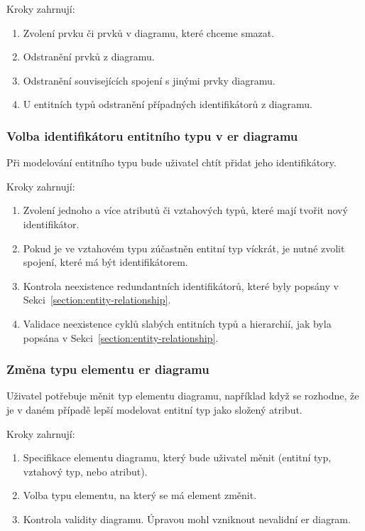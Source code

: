 Kroky zahrnují:
\begin{enumerate}
  \item Zvolení prvku či prvků v diagramu, které chceme smazat.
  \item Odstranění prvků z diagramu.
  \item Odstranění souvisejících spojení s jinými prvky diagramu.
  \item U entitních typů odstranění případných identifikátorů z diagramu.
\end{enumerate}

\subsubsection*{Volba identifikátoru entitního typu v \acrshort{er} diagramu}

Při modelování entitního typu bude uživatel chtít přidat jeho identifikátory.

Kroky zahrnují:
\begin{enumerate}
  \item Zvolení jednoho a více atributů či vztahových typů, které mají tvořit nový identifikátor.
  \item Pokud je ve vztahovém typu zúčastněn entitní typ víckrát, je nutné zvolit spojení, které má být identifikátorem.
  \item Kontrola neexistence redundantních identifikátorů, které byly popsány v Sekci~\ref{section:entity-relationship}.
  \item Validace neexistence cyklů slabých entitních typů a hierarchií, jak byla popsána v Sekci~\ref{section:entity-relationship}.
\end{enumerate}

\subsubsection*{Změna typu elementu \acrshort{er} diagramu}

Uživatel potřebuje měnit typ elementu diagramu, například když se rozhodne, že je v daném případě lepší modelovat entitní typ jako složený atribut.

Kroky zahrnují:
\begin{enumerate}
  \item Specifikace elementu diagramu, který bude uživatel měnit (entitní typ, vztahový typ, nebo atribut).
  \item Volba typu elementu, na který se má element změnit.
  \item Kontrola validity diagramu. Úpravou mohl vzniknout nevalidní \acrshort{er} diagram.
\end{enumerate}

